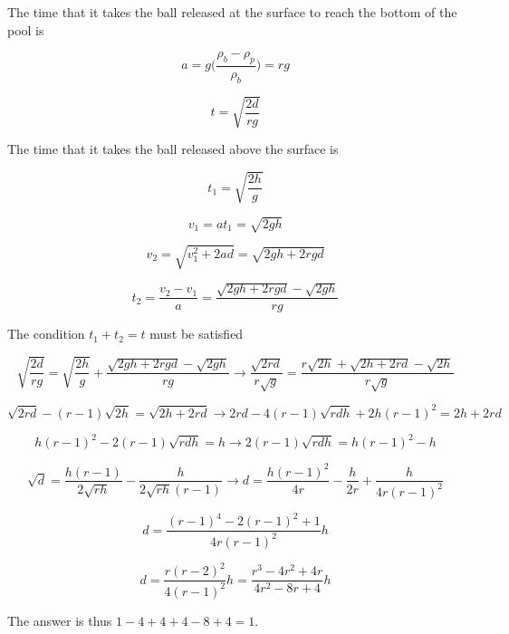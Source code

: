 \begin{solution}
The time that it takes the ball released at the surface to reach the bottom of the pool is

$$a = g\bigg(\frac{\rho_b - \rho_p}{\rho_b}\bigg) = rg$$

$$t = \sqrt{\frac{2d}{rg}}$$

The time that it takes the ball released above the surface is

$$t_1 = \sqrt{\frac{2h}{g}}$$

$$v_1 = at_1 = \sqrt{2gh}$$

$$v_2 = \sqrt{v_1^2 + 2ad} = \sqrt{2gh + 2rgd}$$

$$t_2 = \frac{v_2 - v_1}{a} = \frac{\sqrt{2gh + 2rgd} - \sqrt{2gh}}{rg}$$

The condition $t_1 + t_2 = t$ must be satisfied

$$\sqrt{\frac{2d}{rg}} = \sqrt{\frac{2h}{g}} + \frac{\sqrt{2gh + 2rgd} - \sqrt{2gh}}{rg}\longrightarrow\frac{\sqrt{2rd}}{r\sqrt{g}} = \frac{r\sqrt{2h} + \sqrt{2h + 2rd} - \sqrt{2h}}{r\sqrt{g}}$$

$$\sqrt{2rd} - (r-1)\sqrt{2h} = \sqrt{2h + 2rd}\longrightarrow 2rd - 4(r-1)\sqrt{rdh} + 2h(r-1)^2 = 2h + 2rd$$

$$h(r-1)^2 - 2(r-1)\sqrt{rdh} = h\longrightarrow 2(r-1)\sqrt{rdh} = h(r-1)^2 - h$$

$$\sqrt{d} = \frac{h(r-1)}{2\sqrt{rh}} - \frac{h}{2\sqrt{rh}(r-1)}\longrightarrow d = \frac{h(r-1)^2}{4r} - \frac{h}{2r} + \frac{h}{4r(r-1)^2}$$

$$d = \frac{(r-1)^4-2(r-1)^2 + 1}{4r(r-1)^2} h$$

$$d = \frac{r(r-2)^2}{4(r-1)^2}h = \frac{r^3 - 4r^2 + 4r}{4r^2-8r+4}h$$

The answer is thus $1-4+4+4-8+4=\boxed{1}$.
\end{solution}